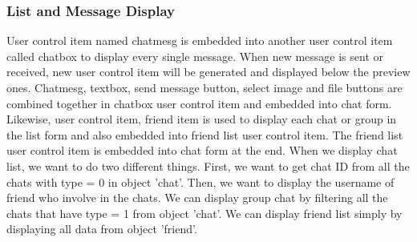 \documentclass[a4paper,11pt]{article}
\begin{document}
\subsubsection{List and Message Display}
User control item named chatmesg is embedded into another user control item called chatbox to display every single message. When new message is sent or received, new user control item will be generated and displayed below the preview ones. Chatmesg, textbox, send message button, select image and file buttons are combined together in chatbox user control item and embedded into chat form. Likewise, user control item, friend item is used to display each chat or group in the list form and also embedded into friend list user control item. The friend list user control item is embedded into chat form at the end.  
When we display chat list, we want to do two different things. First, we want to get chat ID from all the chats with type = 0 in object 'chat'. Then, we want to display the username of friend who involve in the chats.
We can display group chat by filtering all the chats that have type = 1 from object 'chat'.
We can display friend list simply by displaying all data from object 'friend'.
\end{document}

